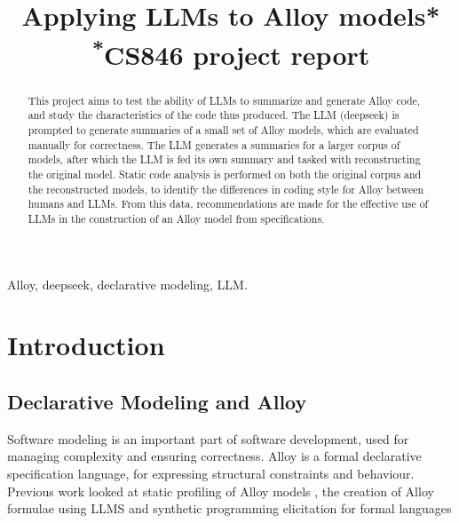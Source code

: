\documentclass[conference]{IEEEtran}
\begin{document}
\title{Applying LLMs to Alloy models*\\
{\footnotesize \textsuperscript{*}CS846 project report}
}

\author{


}

\maketitle

\begin{abstract}
This project aims to test the ability of LLMs to summarize and generate Alloy code, and study the characteristics of the code thus produced. The LLM (deepseek) is prompted to generate summaries of a small set of Alloy models, which are evaluated manually for correctness. The LLM generates a summaries for a larger corpus of models, after which the LLM is fed its own summary and tasked with reconstructing the original model. Static code analysis is performed on both the original corpus and the reconstructed models, to identify the differences in coding style for Alloy between humans and LLMs. From this data, recommendations are made for the effective use of LLMs in the construction of an Alloy model from specifications.
\end{abstract}


\begin{IEEEkeywords}
Alloy, deepseek, declarative modeling, LLM.
\end{IEEEkeywords}


\section{Introduction}


\subsection{Declarative Modeling and Alloy}

Software modeling is an important part of software development, used for managing complexity and ensuring correctness.
Alloy \cite{jackson-reference} is a formal declarative specification language, for expressing structural constraints and behaviour. Previous work looked at static profiling of Alloy models \cite{eid}, the creation of Alloy formulae using LLMS \cite{unnamed} and synthetic programming elicitation for formal languages \cite{mora}
\end{document}
